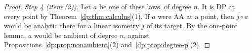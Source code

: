 \begin{proof}
\emph{Step 4 (item (2)).} Let $a$ be one of these laws, of degree $n$. It is DP at every point by Theorem~\ref{dp:thm:calculus}(1). If $a$ were AA at a point, then $j\circ a$ would be analytic there for a linear isometry $j$ of its target. By the one-point lemma, $a$ would be ambient of degree $n$, against Propositions~\ref{dp:prop:nonambient}(2) and~\ref{dp:prop:degree-p}(2).
\end{proof}
